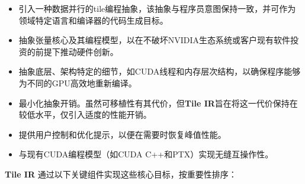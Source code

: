 \documentclass{article}
\begin{document}
\begin{itemize}
\item 引入一种数据并行的tile编程抽象，该抽象与程序员意图保持一致，并可作为领域特定语言和编译器的代码生成目标。
\item 抽象张量核心及其编程模型，以在不破坏NVIDIA生态系统或客户现有软件投资的前提下推动硬件创新。
\item 抽象底层、架构特定的细节，如CUDA线程和内存层次结构，以确保程序能够为不同的GPU高效地重新编译。
\item 最小化抽象开销。虽然可移植性有其代价，但\textbf{Tile IR}旨在将这一代价保持在较低水平，仅引入适度的性能开销。
\item 提供用户控制和优化提示，以便在需要时恢复峰值性能。
\item 与现有CUDA编程模型（如CUDA C++和PTX）实现无缝互操作性。

\end{itemize}
\textbf{Tile IR} 通过以下关键组件实现这些核心目标，按重要性排序：
\end{document}
